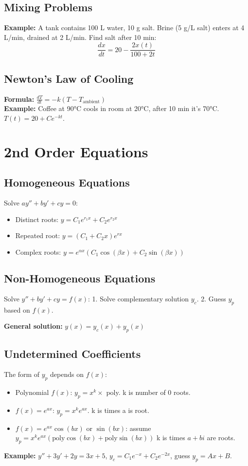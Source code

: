 \begin{multicols}{2}
\subsection*{Mixing Problems}
\textbf{Example:} A tank contains 100 L water, 10 g salt. Brine (5 g/L salt) enters at 4 L/min, drained at 2 L/min. Find salt after 10 min:
\[ \frac{dx}{dt} = 20 - \frac{2x(t)}{100 + 2t} \]

\subsection*{Newton's Law of Cooling}
\textbf{Formula:} 
\( \frac{dT}{dt} = -k(T - T_{\text{ambient}}) \) \\
\textbf{Example:} Coffee at 90°C cools in room at 20°C, after 10 min it's 70°C. \( T(t) = 20 + Ce^{-kt} \).

\section*{2nd Order Equations}
\subsection*{Homogeneous Equations}
Solve \( ay'' + by' + cy = 0 \):
\begin{itemize}
    \item Distinct roots: \( y = C_1 e^{r_1 x} + C_2 e^{r_2 x} \)
    \item Repeated root: \( y = (C_1 + C_2x)e^{r x} \)
    \item Complex roots: \( y = e^{\alpha x}(C_1 \cos(\beta x) + C_2 \sin(\beta x)) \)
\end{itemize}

\subsection*{Non-Homogeneous Equations}
Solve \( y'' + by' + cy = f(x) \):
1. Solve complementary solution \( y_c \). 
2. Guess \( y_p \) based on \( f(x) \).

\textbf{General solution:} \( y(x) = y_c(x) + y_p(x) \)

\subsection*{Undetermined Coefficients}
The form of \( y_p \) depends on \( f(x) \):
\begin{itemize}
    \item Polynomial \( f(x) \): \( y_p = x^k \times \) poly. k is number of 0 roots.
    \item \( f(x) = e^{ax} \): \( y_p = x^k e^{ax} \). k is times a is root.
    \item \( f(x) = e^{ax} \cos(bx) \) or \( \sin(bx) \): assume \( y_p = x^k e^{ax}(\text{poly} \cos(bx) + \text{poly} \sin(bx)) \) k is times \( a+bi \) are roots.
\end{itemize}
\textbf{Example:} \( y'' + 3y' + 2y = 3x + 5 \), \( y_c = C_1 e^{-x} + C_2 e^{-2x} \), guess \( y_p = Ax + B \).


\end{multicols}
